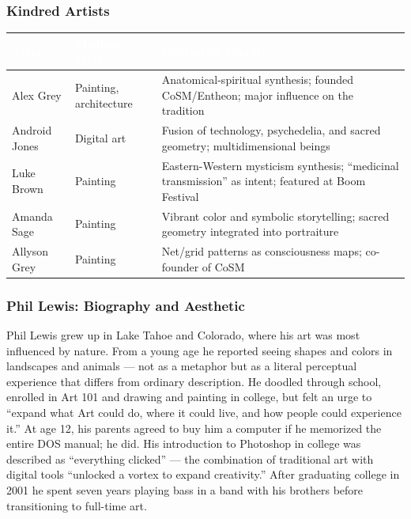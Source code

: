\documentclass[11pt,letterpaper]{article}
\newcommand{\tableheader}[1]{\textbf{\sffamily\textcolor{white}{#1}}}
\begin{document}
\subsubsection{Kindred Artists}

\begin{center}
\begin{tabularx}{\textwidth}{L{3cm}L{3.5cm}X}
\toprule
{}
\tableheader{Artist} & \tableheader{Medium / Style} & \tableheader{Distinctive Quality} \\
\midrule
Alex Grey & Painting, architecture & Anatomical-spiritual synthesis; founded CoSM/Entheon; major influence on the tradition \\
Android Jones & Digital art & Fusion of technology, psychedelia, and sacred geometry; multidimensional beings \\
Luke Brown & Painting & Eastern-Western mysticism synthesis; ``medicinal transmission'' as intent; featured at Boom Festival \\
Amanda Sage & Painting & Vibrant color and symbolic storytelling; sacred geometry integrated into portraiture \\
Allyson Grey & Painting & Net/grid patterns as consciousness maps; co-founder of CoSM \\
\bottomrule
\end{tabularx}
\end{center}

\subsubsection{Phil Lewis: Biography and Aesthetic}

Phil Lewis grew up in Lake Tahoe and Colorado, where his art was most influenced by nature. From a young age he reported seeing shapes and colors in landscapes and animals --- not as a metaphor but as a literal perceptual experience that differs from ordinary description. He doodled through school, enrolled in Art 101 and drawing and painting in college, but felt an urge to ``expand what Art could do, where it could live, and how people could experience it.'' At age 12, his parents agreed to buy him a computer if he memorized the entire DOS manual; he did. His introduction to Photoshop in college was described as ``everything clicked'' --- the combination of traditional art with digital tools ``unlocked a vortex to expand creativity.'' After graduating college in 2001 he spent seven years playing bass in a band with his brothers before transitioning to full-time art.
\end{document}
